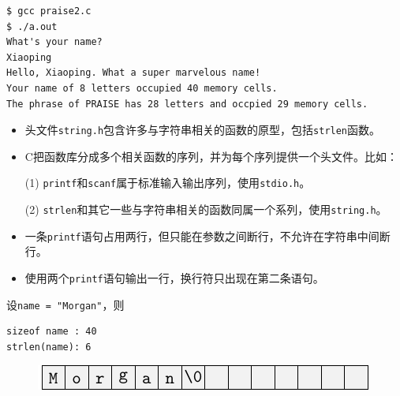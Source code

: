 \begin{frame}[fragile]

\begin{lstlisting}[backgroundcolor=\color{red!10}]
$ gcc praise2.c
$ ./a.out
What's your name?
Xiaoping
Hello, Xiaoping. What a super marvelous name!
Your name of 8 letters occupied 40 memory cells.
The phrase of PRAISE has 28 letters and occpied 29 memory cells.
\end{lstlisting}
\end{frame}

\begin{frame}[fragile]
\begin{itemize}
\item 头文件\lstinline|string.h|包含许多与字符串相关的函数的原型，包括\lstinline|strlen|函数。\\[0.1in]
\item C把函数库分成多个相关函数的序列，并为每个序列提供一个头文件。比如：\\[0.1in]
\item[(1)] \lstinline|printf|和\lstinline|scanf|属于标准输入输出序列，使用\lstinline|stdio.h|。\\[0.1in]
\item[(2)] \lstinline|strlen|和其它一些与字符串相关的函数同属一个系列，使用\lstinline|string.h|。
\end{itemize}
\end{frame}

\begin{frame}[fragile]
\begin{itemize}
\item 一条\lstinline|printf|语句占用两行，但只能在参数之间断行，不允许在字符串中间断行。\\[0.1in]
\item 使用两个\lstinline|printf|语句输出一行，换行符只出现在第二条语句。
\end{itemize}
\end{frame}

\begin{frame}[fragile]
设\lstinline|name = "Morgan"|，则
\begin{lstlisting}[backgroundcolor=\color{red!10}]
sizeof name : 40
strlen(name): 6
\end{lstlisting}

\begin{figure}
\centering
\includegraphics[]{ch04/images/morgan}
\end{figure}
\end{frame}

